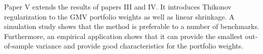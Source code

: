 Paper V extends the results of papers III and IV. 
It introduces Thikonov regularization to the GMV portfolio weights as well as linear shrinkage.
A simulation study shows that the method is preferable to a number of benchmarks. 
Furthermore, an empirical application shows that it can provide the smallest out-of-sample variance and provide good characteristics for the portfolio weights.